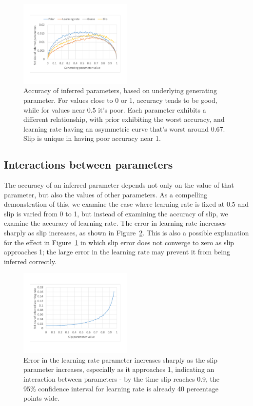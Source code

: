 \documentclass{edm_template}
\begin{document}
\begin{figure}
\label{fig:variance1}
\centering
\includegraphics[width=0.5\textwidth]{data/variance1.pdf}
\caption{Accuracy of inferred parameters, based on underlying generating parameter. For values close to 0 or 1, accuracy tends to be good, while for values near 0.5 it's poor. Each parameter exhibits a different relationship, with prior exhibiting the worst accuracy, and learning rate having an asymmetric curve that's worst around 0.67. Slip is unique in having poor accuracy near 1.}
\end{figure}

\subsection{Interactions between parameters}
\label{variance2}

The accuracy of an inferred parameter depends not only on the value of that parameter, but also the values of other parameters. As a compelling demonstration of this, we examine the case where learning rate is fixed at 0.5 and slip is varied from 0 to 1, but instead of examining the accuracy of slip, we examine the accuracy of learning rate. The error in learning rate increases sharply as slip increases, as shown in Figure~\ref{fig:variance2}. This is also a possible explanation for the effect in Figure~\ref{fig:variance1} in which slip error does not converge to zero as slip approaches 1; the large error in the learning rate may prevent it from being inferred correctly.

\begin{figure}
\label{fig:variance2}
\centering
\includegraphics[width=0.5\textwidth]{data/variance2.pdf}
\caption{Error in the learning rate parameter increases sharply as the slip parameter increases, especially as it approaches 1, indicating an interaction between parameters - by the time slip reaches 0.9, the 95\% confidence interval for learning rate is already 40 percentage points wide.}
\end{figure}
\end{document}
